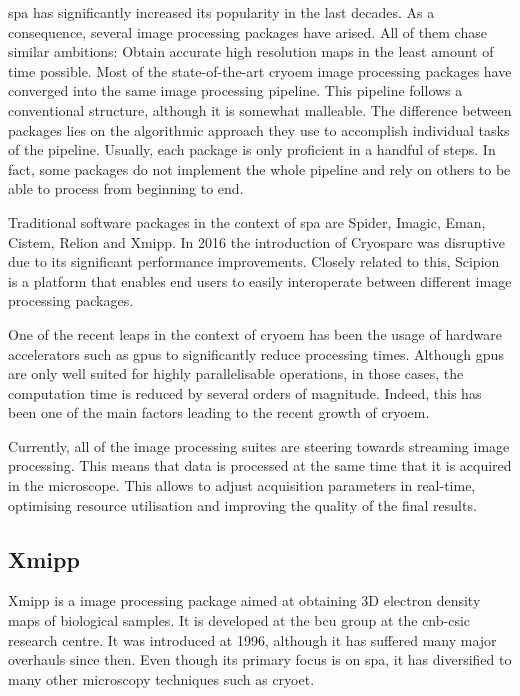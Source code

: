 \documentclass[../main.tex]{subfiles}
\begin{document}
\Gls{spa} has significantly increased its popularity in the last decades. As a consequence, several image processing packages have arised. All of them chase similar ambitions: Obtain accurate high resolution maps in the least amount of time possible. Most of the state-of-the-art \gls{cryoem} image processing packages have converged into the same image processing pipeline. This pipeline follows a conventional structure, although it is somewhat malleable. The difference between packages lies on the algorithmic approach they use to accomplish individual tasks of the pipeline. Usually, each package is only proficient in a handful of steps. In fact, some packages do not implement the whole pipeline and rely on others to be able to process from beginning to end.

Traditional software packages in the context of \gls{spa} are Spider\cite{shaikh2008}, Imagic, Eman\cite{ludke2000}, Cistem\cite{grigorieff2018}, Relion\cite{scheres2021} and Xmipp\cite{sorzano2004}. In 2016 the introduction of Cryosparc\cite{cryosparc} was disruptive due to its significant performance improvements. Closely related to this, Scipion\cite{delarosa2016} is a platform that enables end users to easily interoperate between different image processing packages.

One of the recent leaps in the context of \gls{cryoem} has been the usage of hardware accelerators such as \glspl{gpu} to significantly reduce processing times. Although \glspl{gpu} are only well suited for highly parallelisable operations, in those cases, the computation time is reduced by several orders of magnitude. Indeed, this has been one of the main factors leading to the recent growth of \gls{cryoem}.

Currently, all of the image processing suites are steering towards streaming image processing. This means that data is processed at the same time that it is acquired in the microscope. This allows to adjust acquisition parameters in real-time, optimising resource utilisation and improving the quality of the final results.

\subsection{Xmipp}
Xmipp is a image processing package aimed at obtaining 3D electron density maps of biological samples. It is developed at the \gls{bcu} group at the \gls{cnb}-\gls{csic} research centre. It was introduced at 1996, although it has suffered many major overhauls since then. Even though its primary focus is on \gls{spa}, it has diversified to many other microscopy techniques such as \gls{cryoet}\cite{sorzano2004}.
\end{document}
